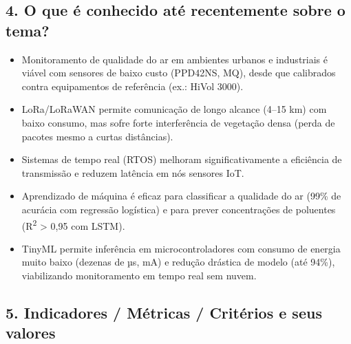 \documentclass[12pt,a4paper]{article}
\begin{document}
\subsection*{4. O que é conhecido até recentemente sobre o tema?}

\begin{itemize}[leftmargin=*]
  \item Monitoramento de qualidade do ar em ambientes urbanos e industriais é viável com sensores de baixo custo (PPD42NS, MQ), desde que calibrados contra equipamentos de referência (ex.: HiVol 3000).
  \item LoRa/LoRaWAN permite comunicação de longo alcance (4–15 km) com baixo consumo, mas sofre forte interferência de vegetação densa (perda de pacotes mesmo a curtas distâncias).
  \item Sistemas de tempo real (RTOS) melhoram significativamente a eficiência de transmissão e reduzem latência em nós sensores IoT.
  \item Aprendizado de máquina é eficaz para classificar a qualidade do ar (99\% de acurácia com regressão logística) e para prever concentrações de poluentes (R\textsuperscript{2} > 0,95 com LSTM).
  \item TinyML permite inferência em microcontroladores com consumo de energia muito baixo (dezenas de µs, mA) e redução drástica de modelo (até 94\%), viabilizando monitoramento em tempo real sem nuvem.
\end{itemize}

\subsection*{5. Indicadores / Métricas / Critérios e seus valores}
\end{document}
